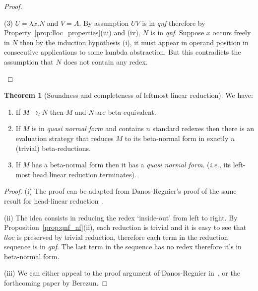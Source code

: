 \documentclass{article}
\makeatletter
\theoremstyle{definition}
\newtheorem{theorem}{Theorem}[section]
\renewcommand\ie{{\it i.e.\@\xspace}}
\makeatother
\begin{document}
\begin{proof}
\begin{compactitem}
\begin{compactitem}
  \item[(3)] $U = \lambda x . N$ and $V = A$.
  By assumption $UV$ is in \emph{qnf} therefore by Property~\ref{prop:lloc_properties}(iii) and (iv), $N$ is in \emph{qnf}.
  Suppose $x$ occurs freely in $N$ then by the induction hypothesis (i), it must appear in operand position in consecutive applications to some lambda abstraction. But this contradicts the assumption that $N$ does not contain any redex.
\end{compactitem}
\end{compactitem}
\end{proof}

\begin{theorem}[Soundness and completeness of leftmost linear reduction]
\label{thm:soundness_leftmostlinearred}
We have:
\begin{enumerate}[label=(\roman*)]
\item If $M \rightarrow_{l} N$ then $M$ and $N$ are beta-equivalent.
\item If $M$ is in \emph{quasi normal form} and contains $n$ standard redexes then there is an evaluation strategy that reduces $M$ to its beta-normal form in exactly $n$ (trivial) beta-reductions.
\item If $M$ has a beta-normal form then it has a \emph{quasi normal form}. (\ie, its left-most head linear reduction terminates).
\end{enumerate}
\end{theorem}
\begin{proof}
(i) The proof can be adapted from Danos-Regnier's proof of the same result for head-linear reduction~\cite{danos-head}.

(ii) The idea consists in reducing the redex `inside-out' from left to right. By Proposition~\ref{prop:qnf_nf}(ii), each reduction is trivial and it is easy to see that  $lloc$ is preserved by trivial reduction, therefore each term in the reduction sequence is in \emph{qnf}. The last term in the sequence has no redex therefore it's in beta-normal form.

(iii) We can either appeal to the proof argument of Danos-Regnier in~\cite{danos-head}, or the forthcoming paper by Berezun\cite{DaniilBerezun_Soundness}.
\end{proof}
\end{document}
